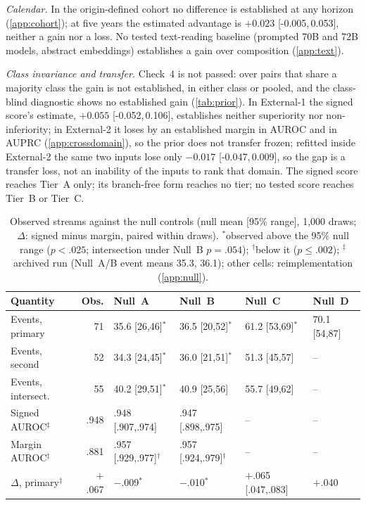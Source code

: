 \documentclass[11pt]{article}
\newcommand{\ci}[2]{[#1,\,#2]}
\begin{document}
\emph{Calendar.} In the origin-defined cohort no difference is established at any horizon
(\cref{app:cohort}); at five years the estimated advantage is
$+0.023$ \ci{-0.005}{0.053}, neither a gain nor a loss. No tested text-reading baseline (prompted 70B and 72B models, abstract embeddings) establishes a gain over composition (\cref{app:text}).

\emph{Class invariance and transfer.} Check~4 is not passed: over pairs that share a majority
class the gain is not established, in either class or pooled, and the class-blind diagnostic shows
no established gain (\cref{tab:prior}). In External-1 the signed score's estimate, $+0.055$
\ci{-0.052}{0.106}, establishes neither superiority nor non-inferiority; in External-2 it loses by an established margin in AUROC and in AUPRC (\cref{app:crossdomain}), so the prior does not transfer frozen; refitted inside External-2 the
same two inputs lose only $-0.017$ \ci{-0.047}{0.009}, so the gap is a transfer loss, not an
inability of the inputs to rank that domain. The signed score reaches Tier~A only; its branch-free form reaches no tier; no tested score reaches Tier~B or Tier~C.

\begin{table}[!t]\centering\footnotesize
\setlength{\tabcolsep}{5pt}
\begin{tabular}{@{}lrllll@{}}
\toprule
Quantity & Obs. & Null~A & Null~B & Null~C & Null~D \\
\midrule
Events, primary & 71 & 35.6 [26,46]$^{\ast}$ & 36.5 [20,52]$^{\ast}$ & 61.2 [53,69]$^{\ast}$ & 70.1 [54,87] \\
Events, second & 52 & 34.3 [24,45]$^{\ast}$ & 36.0 [21,51]$^{\ast}$ & 51.3 [45,57] & -- \\
Events, intersect. & 55 & 40.2 [29,51]$^{\ast}$ & 40.9 [25,56] & 55.7 [49,62] & -- \\
\midrule
Signed AUROC$^{\ddagger}$ & .948 & .948 [.907,.974] & .947 [.898,.975] & -- & -- \\
Margin AUROC$^{\ddagger}$ & .881 & .957 [.929,.977]$^{\dagger}$ & .957 [.924,.979]$^{\dagger}$ & -- & -- \\
$\Delta$, primary$^{\ddagger}$ & $+$.067 & $-$.009$^{\ast}$ & $-$.010$^{\ast}$ & $+$.065 [.047,.083] & $+$.040 \\
\bottomrule
\end{tabular}
\caption{Observed streams against the null controls (null mean [95\% range], 1{,}000 draws;
$\Delta$: signed minus margin, paired within draws). $^{\ast}$observed above the 95\% null range
($p<.025$; intersection under Null~B $p=.054$); $^{\dagger}$below it ($p\le.002$);
$^{\ddagger}$archived run (Null~A/B event means 35.3, 36.1); other cells: reimplementation
(\cref{app:null}).}
\label{tab:null}
\end{table}
\end{document}
